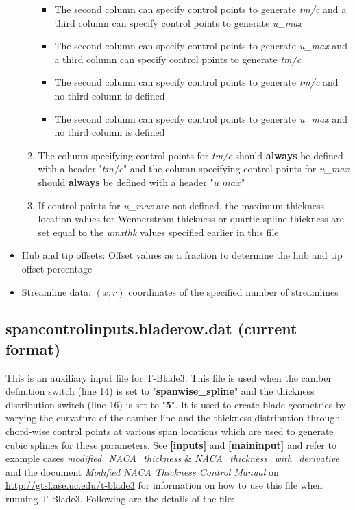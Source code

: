 \documentclass[8pt]{article}
\begin{document}
\begin{itemize}[leftmargin=*]
\begin{enumerate}[label=\alph*]
\begin{itemize}[label=\FilledSmallSquare]
            \item The second column can specify control points to generate \textit{tm/c} and a third column can specify control points to generate \textit{u\_max}
            \item The second column can specify control points to generate \textit{u\_max} and a third column can specify control points to generate \textit{tm/c}
            \item The second column can specify control points to generate \textit{tm/c} and no third column is defined
            \item The second column can specify control points to generate \textit{u\_max} and no third column is defined
        \end{itemize}
        \item The column specifying control points for \textit{tm/c} should \textbf{always} be defined with a header "$tm/c$" and the column specifying control points for \textit{u\_max} should \textbf{always} be defined with a header "$u\_max$"
        \item If control points for \textit{u\_max} are not defined, the maximum thickness location values for Wennerstrom thickness or quartic spline thickness are set equal to the \textit{umxthk} values specified earlier in this file
    \end{enumerate}
    \item Hub and tip offsets: Offset values as a fraction to determine the hub and tip offset percentage
    \item Streamline data: $(x,r)$ coordinates of the specified number of streamlines
\end{itemize}

\subsection{spancontrolinputs.bladerow.dat (current format)}\label{auxinput_NACA}
\noindent
This is an auxiliary input file for T-Blade3. This file is used when the camber definition switch (line 14) is set to "\textbf{spanwise\_spline}" and the thickness distribution switch (line 16) is set to "$\mathbf{5}$". It is used to create blade geometries by varying the curvature of the camber line and the thickness distribution through chord-wise control points at various span locations which are used to generate cubic splines for these parameters. See \textbf{\ref{inputs}} and \textbf{\ref{maininput}} and refer to example cases \textit{modified\_NACA\_thickness} \& \textit{NACA\_thickness\_with\_derivative} and the document \textit{Modified NACA Thickness Control Manual} on \url{http://gtsl.ase.uc.edu/t-blade3} for information on how to use this file when running T-Blade3. Following are the details of the file:
\end{document}
